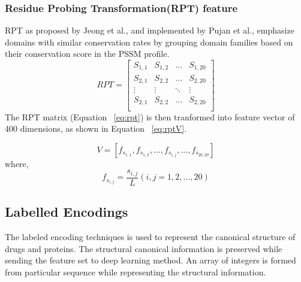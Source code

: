   \subsubsection{Residue Probing Transformation(RPT) feature}
  RPT as proposed by Jeong et al.\cite{Jeong2011}, and implemented by Pujan et al.\cite{Mishra2019}, emphasize domains with similar conservation rates by grouping domain families based on their conservation score in the PSSM profile.
  \begin{equation}
    RPT = \begin{bmatrix}
      S_{1,1} & S_{1,2} & \dots & S_{1,20} \\
      S_{2,1} & S_{2,2} & \dots & S_{2,20} \\
      \vdots  & \vdots  & \ddots & \vdots \\
      S_{2,1} & S_{2,2} & \dots & S_{2,20} \\
    \end{bmatrix}
    \label{eq:rpt}
  \end{equation}
  The RPT matrix (Equation ~\ref{eq:rpt}) is then tranformed into feature vector of 400 dimensions, as shown in Equation ~\ref{eq:rptV}.
  
  \begin{equation}
    V = [ f_{s_{1,1}}, f_{s_{1,2}}, \dots, f_{s_{i,j}}, \dots, f_{s_{20,20}} ]
    \label{eq:rptV}
  \end{equation}
  where, 
  \begin{equation}
    f_{s_{i,j}} = \frac{s_{i,j}}{L} (i,j = 1,2,\dots,20)
    \label{eq:rptF}
  \end{equation}

  \subsection{Labelled Encodings}
  
  The labeled encoding techniques is used to represent the canonical structure of drugs and proteins. The structural canonical information is preserved while sending the feature set to deep learning method. An array of integers is formed from particular sequence while representing the structural information.
  
